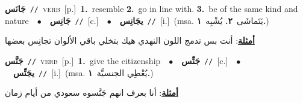 \documentclass[10pt,a4paper,twoside]{article} %
\begin{document}
\begin{multicols}{2}
{\setlength\topsep{0pt}\textbf{\foreignlanguage{arabic}{جَانَس}}\ {\color{gray}\texttt{//}\color{black}}\ \textsc{verb}\ [p.]\ \textbf{1.}~resemble  \textbf{2.}~go in line with.  \textbf{3.}~be of the same kind and nature\ \ $\bullet$\ \ \setlength\topsep{0pt}\textbf{\foreignlanguage{arabic}{جَانِس}}\ {\color{gray}\texttt{//}\color{black}}\ [c.]\ \ $\bullet$\ \ \setlength\topsep{0pt}\textbf{\foreignlanguage{arabic}{يجَانِس}}\ {\color{gray}\texttt{//}\color{black}}\ [i.]\ \color{gray}(msa. \foreignlanguage{arabic}{يَتَماشَى}~\foreignlanguage{arabic}{\textbf{٢.}}  \foreignlanguage{arabic}{يُشْبِه}~\foreignlanguage{arabic}{\textbf{١.}})\color{black}\  \begin{flushright}\color{gray}\foreignlanguage{arabic}{\textbf{\underline{\foreignlanguage{arabic}{أمثلة}}}: أنت بس تدمج اللون النهدي هيك بتخلي باقي الألوان تجانِس بعضها}\end{flushright}\color{black}} \vspace{2mm}

{\setlength\topsep{0pt}\textbf{\foreignlanguage{arabic}{جَنَّس}}\ {\color{gray}\texttt{//}\color{black}}\ \textsc{verb}\ [p.]\ \textbf{1.}~give the citizenship\ \ $\bullet$\ \ \setlength\topsep{0pt}\textbf{\foreignlanguage{arabic}{جَنِّس}}\ {\color{gray}\texttt{//}\color{black}}\ [c.]\ \ $\bullet$\ \ \setlength\topsep{0pt}\textbf{\foreignlanguage{arabic}{يجَنِّس}}\ {\color{gray}\texttt{//}\color{black}}\ [i.]\ \color{gray}(msa. \foreignlanguage{arabic}{يُعْطِي الجنسيَّة}~\foreignlanguage{arabic}{\textbf{١.}})\color{black}\  \begin{flushright}\color{gray}\foreignlanguage{arabic}{\textbf{\underline{\foreignlanguage{arabic}{أمثلة}}}: أنا بعرف انهم جَنَّسوه سعودي من أيام زمان}\end{flushright}\color{black}} \vspace{2mm}


\end{multicols}
\end{document}
